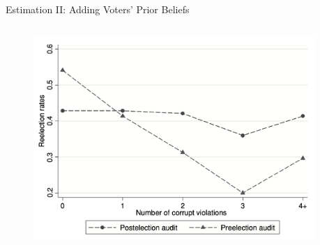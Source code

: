 \begin{frame}{Estimation II: Adding Voters' Prior Beliefs}


    \begin{columns}

        \begin{column}{0.4\textwidth}
            \begin{figure}
            \centering
            \includegraphics[height = 0.55 \textheight]{images/fig3.png}
            \end{figure}
        \end{column}

        \begin{column}{0.55\textwidth}

\end{column}
\end{columns}
\end{frame}
